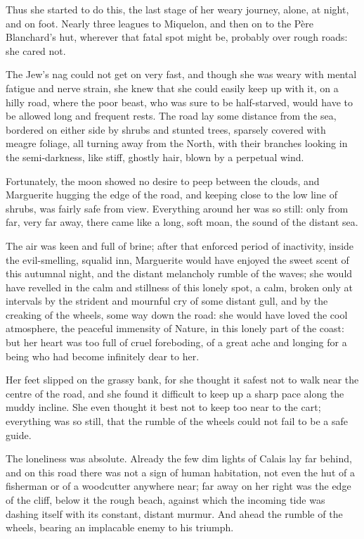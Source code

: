 \documentclass[paper=a5,BCOR=7mm,twoside,DIV=calc,12pt,usegeometry,chapterprefix,endperiod,headings=big]{scrbook}
\begin{document}
Thus she started to do this, the last stage of her weary journey, alone, at night, and on foot. Nearly three leagues to Miquelon, and then on to the Père Blanchard's hut, wherever that fatal spot might be, probably over rough roads: she cared not.

The Jew's nag could not get on very fast, and though she was weary with mental fatigue and nerve strain, she knew that she could easily keep up with it, on a hilly road, where the poor beast, who was sure to be half-starved, would have to be allowed long and frequent rests. The road lay some distance from the sea, bordered on either side by shrubs and stunted trees, sparsely covered with meagre foliage, all turning away from the North, with their branches looking in the semi-darkness, like stiff, ghostly hair, blown by a perpetual wind.

Fortunately, the moon showed no desire to peep between the clouds, and Marguerite hugging the edge of the road, and keeping close to the low line of shrubs, was fairly safe from view. Everything around her was so still: only from far, very far away, there came like a long, soft moan, the sound of the distant sea.

The air was keen and full of brine; after that enforced period of inactivity, inside the evil-smelling, squalid inn, Marguerite would have enjoyed the sweet scent of this autumnal night, and the distant melancholy rumble of the waves; she would have revelled in the calm and stillness of this lonely spot, a calm, broken only at intervals by the strident and mournful cry of some distant gull, and by the creaking of the wheels, some way down the road: she would have loved the cool atmosphere, the peaceful immensity of Nature, in this lonely part of the coast: but her heart was too full of cruel foreboding, of a great ache and longing for a being who had become infinitely dear to her.

Her feet slipped on the grassy bank, for she thought it safest not to walk near the centre of the road, and she found it difficult to keep up a sharp pace along the muddy incline. She even thought it best not to keep too near to the cart; everything was so still, that the rumble of the wheels could not fail to be a safe guide.

The loneliness was absolute. Already the few dim lights of Calais lay far behind, and on this road there was not a sign of human habitation, not even the hut of a fisherman or of a woodcutter anywhere near; far away on her right was the edge of the cliff, below it the rough beach, against which the incoming tide was dashing itself with its constant, distant murmur. And ahead the rumble of the wheels, bearing an implacable enemy to his triumph.
\end{document}
